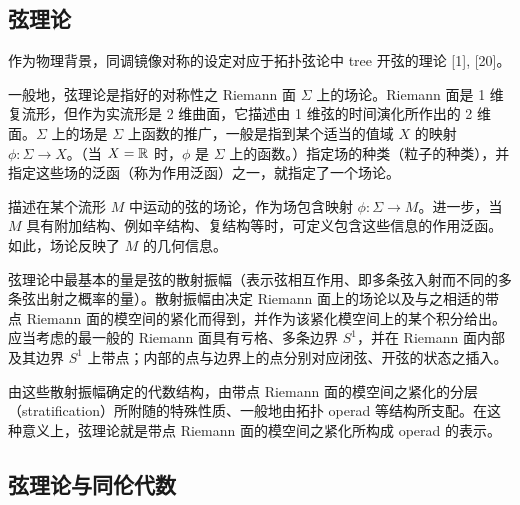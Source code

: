 \subsection{弦理论}

作为物理背景，同调镜像对称的设定对应于拓扑弦论中 tree 开弦的理论 [1], [20]。

一般地，弦理论是指好的对称性之 Riemann 面 $\Sigma$ 上的场论。Riemann 面是 1 维复流形，但作为实流形是 2 维曲面，它描述由 1 维弦的时间演化所作出的 2 维面。$\Sigma$ 上的场是 $\Sigma$ 上函数的推广，一般是指到某个适当的值域 $X$ 的映射 $\phi : \Sigma\to X$。（当 $X=\mathbb{R}$ 时，$\phi$ 是 $\Sigma$ 上的函数。）指定场的种类（粒子的种类），并指定这些场的泛函（称为作用泛函）之一，就指定了一个场论。

描述在某个流形 $M$ 中运动的弦的场论，作为场包含映射 $\phi : \Sigma\to M$。进一步，当 $M$ 具有附加结构、例如辛结构、复结构等时，可定义包含这些信息的作用泛函。如此，场论反映了 $M$ 的几何信息。

弦理论中最基本的量是弦的散射振幅（表示弦相互作用、即多条弦入射而不同的多条弦出射之概率的量）。散射振幅由决定 Riemann 面上的场论以及与之相适的带点 Riemann 面的模空间的紧化而得到，并作为该紧化模空间上的某个积分给出。应当考虑的最一般的 Riemann 面具有亏格、多条边界 $S^1$，并在 Riemann 面内部及其边界 $S^1$ 上带点；内部的点与边界上的点分别对应闭弦、开弦的状态之插入。



由这些散射振幅确定的代数结构，由带点 Riemann 面的模空间之紧化的分层（stratification）所附随的特殊性质、一般地由拓扑 operad 等结构所支配。在这种意义上，弦理论就是带点 Riemann 面的模空间之紧化所构成 operad 的表示。

\subsection{弦理论与同伦代数}

